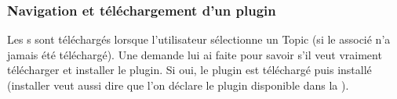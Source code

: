 \subsubsection{Navigation et téléchargement d'un plugin}
Les \plugin s sont téléchargés lorsque l'utilisateur sélectionne un Topic (si le \plugin{} associé n'a jamais été téléchargé). Une demande lui ai faite pour savoir s'il veut vraiment télécharger et installer le plugin. 
Si oui, le plugin est téléchargé puis installé (installer veut aussi dire que l'on déclare le plugin disponible dans la \bdd{}).
